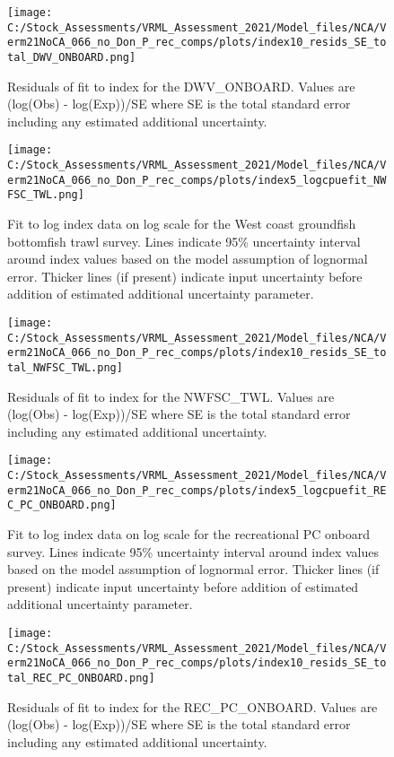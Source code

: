 \documentclass[11pt,
  english,
  a4paper,
]{article}
\begin{document}
\begin{figure}
\centering
\texttt{[image: C:/Stock\_Assessments/VRML\_Assessment\_2021/Model\_files/NCA/Verm21NoCA\_066\_no\_Don\_P\_rec\_comps/plots/index10\_resids\_SE\_total\_DWV\_ONBOARD.png]}
\caption{Residuals of fit to index for the DWV\_ONBOARD. Values are (log(Obs) - log(Exp))/SE where SE is the total standard error including any estimated additional uncertainty.\label{fig:cpue-resid-DWV-ONBOARD}}
\end{figure}

\begin{figure}
\centering
\texttt{[image: C:/Stock\_Assessments/VRML\_Assessment\_2021/Model\_files/NCA/Verm21NoCA\_066\_no\_Don\_P\_rec\_comps/plots/index5\_logcpuefit\_NWFSC\_TWL.png]}
\caption{Fit to log index data on log scale for the West coast groundfish bottomfish trawl survey. Lines indicate 95\% uncertainty interval around index values based on the model assumption of lognormal error. Thicker lines (if present) indicate input uncertainty before addition of estimated additional uncertainty parameter.\label{fig:log-cpue-NWFSC-TWL}}
\end{figure}

\begin{figure}
\centering
\texttt{[image: C:/Stock\_Assessments/VRML\_Assessment\_2021/Model\_files/NCA/Verm21NoCA\_066\_no\_Don\_P\_rec\_comps/plots/index10\_resids\_SE\_total\_NWFSC\_TWL.png]}
\caption{Residuals of fit to index for the NWFSC\_TWL. Values are (log(Obs) - log(Exp))/SE where SE is the total standard error including any estimated additional uncertainty.\label{fig:cpue-resid-NWFSC-TWL}}
\end{figure}

\begin{figure}
\centering
\texttt{[image: C:/Stock\_Assessments/VRML\_Assessment\_2021/Model\_files/NCA/Verm21NoCA\_066\_no\_Don\_P\_rec\_comps/plots/index5\_logcpuefit\_REC\_PC\_ONBOARD.png]}
\caption{Fit to log index data on log scale for the recreational PC onboard survey. Lines indicate 95\% uncertainty interval around index values based on the model assumption of lognormal error. Thicker lines (if present) indicate input uncertainty before addition of estimated additional uncertainty parameter.\label{fig:log-cpue-REC-PC-ONBOARD}}
\end{figure}

\begin{figure}
\centering
\texttt{[image: C:/Stock\_Assessments/VRML\_Assessment\_2021/Model\_files/NCA/Verm21NoCA\_066\_no\_Don\_P\_rec\_comps/plots/index10\_resids\_SE\_total\_REC\_PC\_ONBOARD.png]}
\caption{Residuals of fit to index for the REC\_PC\_ONBOARD. Values are (log(Obs) - log(Exp))/SE where SE is the total standard error including any estimated additional uncertainty.\label{fig:cpue-resid-REC-PC-ONBOARD}}
\end{figure}
\end{document}
